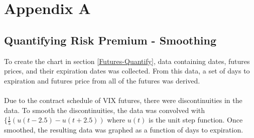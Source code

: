 \documentclass[11pt, oneside]{book}
\begin{document}
\chapter{Appendix A} \label{AppendixA}
\section{Quantifying Risk Premium - Smoothing} \label{AppendixA-Smooting}
To create the chart in section \ref{Futures-Quantify}, data containing dates, futures prices, and their expiration dates was collected. From this data, a set of days to expiration and futures price from all of the futures was derived. \\
\\
Due to the contract schedule of VIX futures, there were discontinuities in the data. To smooth the discontinuities, the data was convolved with $\{\frac{1}{5}(u(t-2.5)-u(t+2.5))$ where $u(t)$ is the unit step function. Once smoothed, the resulting data was graphed as a function of days to expiration. 
\backmatter
\end{document}
